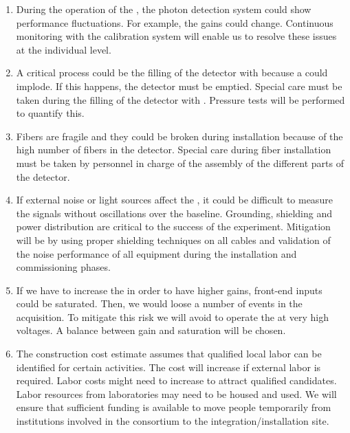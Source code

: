 \begin{enumerate}

\item During the operation of the , the photon detection system could show performance fluctuations. For example, the  gains could change. Continuous monitoring with the  calibration system will enable us to resolve these issues at the individual  level.

\item A critical process could be the filling of the detector with  because a  could implode. If this happens, the detector must be emptied. Special care must be taken during the filling of the detector with . Pressure tests will be performed to quantify this.

\item Fibers are fragile and they could be broken during installation because of the high number of fibers in the detector. Special care during fiber installation must be taken by personnel in charge of the assembly of the different parts of the detector.

\item If external noise or light sources affect the , it could be difficult to measure the signals without oscillations over the baseline. Grounding, shielding and power distribution are critical to the success of the experiment. Mitigation will be by using proper shielding techniques on all cables and validation of the noise performance of all equipment during the installation and commissioning phases.

\item If we have to increase the   in order to have higher gains,  front-end inputs could be saturated. Then, we would loose a number of events in the acquisition. To mitigate this risk we will avoid to operate the  at very high voltages. A balance between gain and saturation will be chosen.

\item The  construction cost estimate assumes that qualified local labor can be identified for certain activities. The cost will increase if external labor is required. Labor costs might need to increase to attract qualified candidates. Labor resources from laboratories may need to be housed and used. We will ensure that sufficient funding is available to move people temporarily from institutions involved in the  consortium to the integration/installation site.


\end{enumerate}

